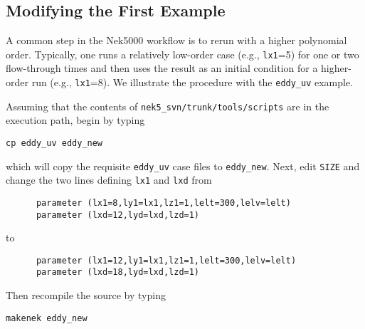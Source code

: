 \begin{comment}
through the following sequence: 
\begin{tabular}{r l l l}
  & {\bf click} \hspace*{1in} &{\bf type} \hspace*{1in} & {\bf comment} \\ \hline
1.& SET TIME         & 11 & load fld11 \\
2.& SET QUANTITY \\
3.& VELOCITY \\
4.& MAGNITUDE \\
5.& PLOT  \\
\end{tabular}
\end{comment}

\subsection{Modifying the First Example}

A common step in the Nek5000 workflow is to rerun with a higher
polynomial order.   Typically, one runs a relatively low-order case
(e.g., {\tt lx1}=5) for one or two flow-through times and then uses
the result as an initial condition for a higher-order run
(e.g., {\tt lx1}=8).  We illustrate the procedure with the 
{\tt eddy\_uv} example.

Assuming that the contents of {\tt nek5\_svn/trunk/tools/scripts}
are in the execution path, begin by typing
\begin{verbatim}
cp eddy_uv eddy_new
\end{verbatim}
which will copy the requisite {\tt eddy\_uv} case files
to {\tt eddy\_new}.  
Next, edit {\tt SIZE} and change the two lines defining
{\tt lx1} and {\tt lxd} from
\begin{verbatim}
      parameter (lx1=8,ly1=lx1,lz1=1,lelt=300,lelv=lelt)
      parameter (lxd=12,lyd=lxd,lzd=1)
\end{verbatim}
to
\begin{verbatim}
      parameter (lx1=12,ly1=lx1,lz1=1,lelt=300,lelv=lelt)
      parameter (lxd=18,lyd=lxd,lzd=1)
\end{verbatim}
Then recompile the source by typing
\begin{verbatim}
makenek eddy_new
\end{verbatim}

